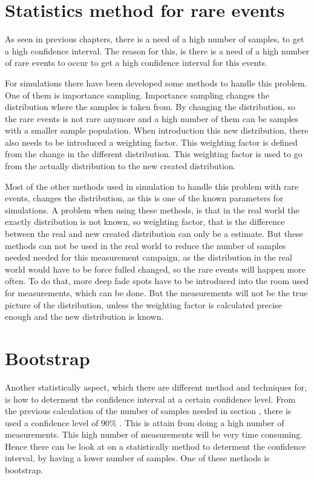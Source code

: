 \section{Statistics method for rare events}
As seen in previous chapters, there is a need of a high number of samples, to get a high confidence interval. The reason for this, is there is a need of a high number of rare events to occur to get a high confidence interval for this events. 

For simulations there have been developed some methods to handle this problem. One of them is importance sampling. Importance sampling changes the distribution where the samples is taken from. By changing the distribution, so the rare events is not rare anymore and a high number of them can be samples with a smaller sample population. When introduction this new distribution, there also needs to be introduced a weighting factor. This weighting factor is defined from the change in the different distribution. This weighting factor is used to go from the actually distribution to the new created distribution.

Most of the other methods used in simulation to handle this problem with rare events, changes the distribution, as this is one of the known parameters for simulations. A problem when using these methods, is that in the real world the exactly distribution is not known, so weighting factor, that is the difference between the real and new created distribution can only be a estimate. But these methods can not be used in the real world to reduce the number of samples needed needed for this measurement campaign, as the distribution in the real world would have to be force fulled changed, so the rare events will happen more often. To do that, more deep fade spots have to be introduced into the room used for measurements, which can be done. But the measurements will not be the true picture of the distribution, unless the weighting factor is calculated precise enough and the new distribution is known.




\section{Bootstrap}
Another statistically aspect, which there are different method and techniques for, is how to determent the confidence interval at a certain confidence level. From the previous calculation of the number of samples needed in section , there is used a confidence level of 90\% . This is attain from doing a high number of measurements. This high number of measurements will be very time consuming. Hence there can be look at on a statistically method to determent the confidence interval, by having a lower number of samples. One of these methods is bootstrap.

